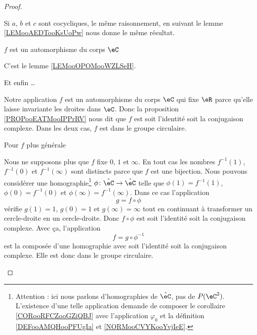 \begin{proof}
\begin{subproof}
\begin{subproof}
                     Si \( a\), \( b\) et \( c\) sont cocycliques, le même raisonnement, en suivant le lemme \ref{LEMooAEDTooKsUoPw} nous donne le même résultat.

                 \item[\( f\) est un automorphisme du corps \( \eC\)]

                     C'est le lemme \ref{LEMooOPOMooWZLSeH}.

                 \item[Et enfin \ldots]

                     Notre application \( f\) est un automorphisme du corps \( \eC\) qui fixe \( \eR\) parce qu'elle laisse invariante les droites dans \( \eC\). Donc la proposition \ref{PROPooEATMooIPPrRV} nous dit que \( f\) est soit l'identité soit la conjugaison complexe. Dans les deux cas, \( f\) est dans le groupe circulaire.

            \end{subproof}
            
        \item[Pour \( f\) plus générale]

            Nous ne supposons plus que $f$ fixe \( 0\), \( 1\) et \( \infty\). En tout cas les nombres \( f^{-1}(1)\), \( f^{-1}(0)\) et \( f^{-1}(\infty)\) sont distincts parce que \( f\) est une bijection. Nous pouvons considérer une homographie\footnote{Attention : ici nous parlons d'homographies de \( \hat \eC\), pas de \( P(\eC^2)\). L'existence d'une telle application demande de composer le corollaire \ref{CORooRFCZooGZiQBJ} avec l'application \( \varphi_0\) et la définition \ref{DEFooAMQHooPFUgIa} et \ref{NORMooCVYKooYvjIeE}.} \( \phi\colon \hat \eC\to \hat \eC\) telle que \( \phi(1)=f^{-1}(1)\), \( \phi(0)=f^{-1}(0)\) et \( \phi(\infty)=f^{-1}(\infty)\). Dans ce cas l'application
            \begin{equation}
                g=f\circ\phi
            \end{equation}
            vérifie \( g(1)=1\), \( g(0)=1\) et \( g(\infty)=\infty\) tout en continuant à transformer un cercle-droite en un cercle-droite. Donc \( f\circ\phi\) est soit l'identité soit la conjugaison complexe. Avec ça, l'application
            \begin{equation}
                f=g\circ\phi^{-1}
            \end{equation}
            est la composée d'une homographie avec soit l'identité soit la conjugaison complexe. Elle est donc dans le groupe circulaire.
    \end{subproof}
\end{proof}

